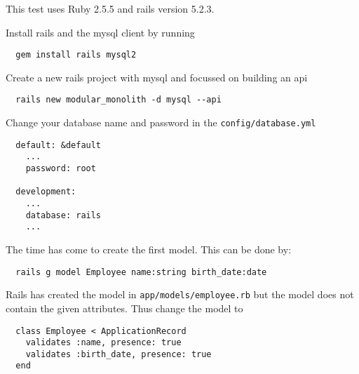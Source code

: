 This test uses Ruby 2.5.5 and rails version 5.2.3.

Install rails and the mysql client by running
\begin{verbatim}
  gem install rails mysql2
\end{verbatim}

Create a new rails project with mysql and focussed on building an api
\begin{verbatim}
  rails new modular_monolith -d mysql --api
\end{verbatim}

Change your database name and password in the \texttt{config/database.yml}
\begin{verbatim}
  default: &default
    ...
    password: root

  development:
    ...
    database: rails
    ...
\end{verbatim}

The time has come to create the first model. This can be done by:
\begin{verbatim}
  rails g model Employee name:string birth_date:date
\end{verbatim}

Rails has created the model in \texttt{app/models/employee.rb} but the model does not contain the given attributes. Thus change the model to
\begin{verbatim}
  class Employee < ApplicationRecord
    validates :name, presence: true
    validates :birth_date, presence: true
  end
\end{verbatim}